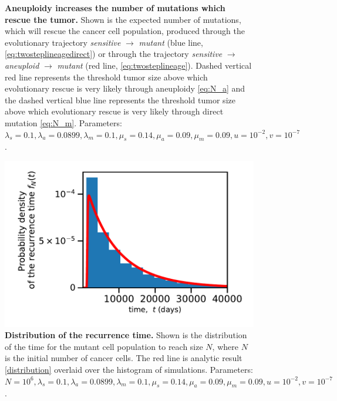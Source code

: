 \documentclass[12pt]{extarticle}
\begin{document}
\begin{appendices}
\begin{figure}
\caption{\textbf{Aneuploidy increases the number of mutations which rescue the tumor.} Shown is the expected number of mutations, which will rescue the cancer cell population, produced through the evolutionary trajectory \textit{sensitive} $\rightarrow$ \textit{mutant} (blue line, \cref{eq:twosteplineagedirect}) or through the trajectory \textit{sensitive} $\rightarrow$ \textit{aneuploid} $\rightarrow$ \textit{mutant} (red line, \cref{eq:twosteplineage}). Dashed vertical red line represents the threshold tumor size above which evolutionary rescue is very likely through aneuploidy \cref{eq:N_a} and the dashed vertical blue line represents the threshold tumor size above which evolutionary rescue is very likely through direct mutation \cref{eq:N_m}.
Parameters: $\lambda_s=0.1,\lambda_a=0.0899,\lambda_m=0.1,\mu_s=0.14,\mu_a=0.09,\mu_m=0.09, u=10^{-2}, v=10^{-7}$.} %
\label{ExpectedNumberRescueLineages}
\end{figure}
\begin{figure}
\vspace*{1\baselineskip}
\includegraphics[width=1\textwidth]{Figures/KaplanMeierDistribution.pdf}
\caption{\textbf{Distribution of the recurrence time.}
Shown is the distribution of the time for the mutant cell population to reach size $N$, where $N$ is the initial number of cancer cells. The red line is analytic result \cref{distribution} overlaid over the histogram of simulations. 
Parameters: $N=10^6, \lambda_s=0.1,\lambda_a=0.0899,\lambda_m=0.1,\mu_s=0.14,\mu_a=0.09,\mu_m=0.09, u=10^{-2}, v=10^{-7}$.}
\label{KMdistribution}
\end{figure}
\begin{figure}

\end{figure}
\end{appendices}
\end{document}
